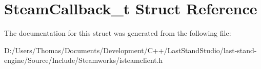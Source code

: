 \hypertarget{structSteamCallback__t}{}\section{Steam\+Callback\+\_\+t Struct Reference}
\label{structSteamCallback__t}


The documentation for this struct was generated from the following file\+:\begin{DoxyCompactItemize}
\item 
D\+:/\+Users/\+Thomas/\+Documents/\+Development/\+C++/\+Last\+Stand\+Studio/last-\/stand-\/engine/\+Source/\+Include/\+Steamworks/isteamclient.\+h\end{DoxyCompactItemize}
